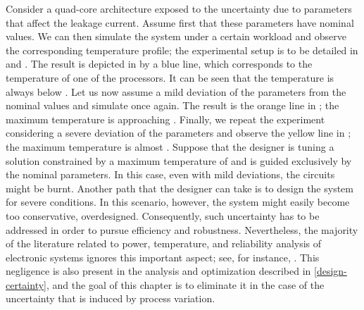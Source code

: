 Consider a quad-core architecture exposed to the uncertainty due to parameters
that affect the leakage current. Assume first that these parameters have nominal
values. We can then simulate the system under a certain workload and observe the
corresponding temperature profile; the experimental setup is to be detailed in
 and . The
result is depicted in  by a blue line, which corresponds to
the temperature of one of the processors. It can be seen that the temperature is
always below . Let us now assume a mild deviation of the parameters
from the nominal values and simulate once again. The result is the orange line
in ; the maximum temperature is approaching .
Finally, we repeat the experiment considering a severe deviation of the
parameters and observe the yellow line in ; the maximum
temperature is almost . Suppose that the designer is tuning a
solution constrained by a maximum temperature of  and is guided
exclusively by the nominal parameters. In this case, even with mild deviations,
the circuits might be burnt. Another path that the designer can take is to
design the system for severe conditions. In this scenario, however, the system
might easily become too conservative, overdesigned. Consequently, such
uncertainty has to be addressed in order to pursue efficiency and robustness.
Nevertheless, the majority of the literature related to power, temperature, and
reliability analysis of electronic systems ignores this important aspect; see,
for instance, \cite{rao2009, rai2011, thiele2011}. This negligence is also
present in the analysis and optimization described in \cref{design-certainty},
and the goal of this chapter is to eliminate it in the case of the uncertainty
that is induced by process variation.
